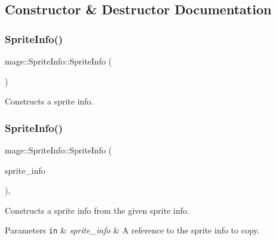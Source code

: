 \subsection{Constructor \& Destructor Documentation}
\hypertarget{structmage_1_1_sprite_info_ade666769e0e2137e68de6fd67502b234}{}\label{structmage_1_1_sprite_info_ade666769e0e2137e68de6fd67502b234} 
\subsubsection{\texorpdfstring{Sprite\+Info()}{SpriteInfo()}\hspace{0.1cm}{\footnotesize\ttfamily [1/3]}}
{\footnotesize\ttfamily mage\+::\+Sprite\+Info\+::\+Sprite\+Info (\begin{DoxyParamCaption}{ }\end{DoxyParamCaption})\hspace{0.3cm}{\ttfamily [noexcept]}}

Constructs a sprite info. \hypertarget{structmage_1_1_sprite_info_a982583a2e82d55a817d9f05f423ff4cf}{}\label{structmage_1_1_sprite_info_a982583a2e82d55a817d9f05f423ff4cf} 
\subsubsection{\texorpdfstring{Sprite\+Info()}{SpriteInfo()}\hspace{0.1cm}{\footnotesize\ttfamily [2/3]}}
{\footnotesize\ttfamily mage\+::\+Sprite\+Info\+::\+Sprite\+Info (\begin{DoxyParamCaption}\item[{const \hyperlink{structmage_1_1_sprite_info}{Sprite\+Info} \&}]{sprite\+\_\+info }\end{DoxyParamCaption})\hspace{0.3cm}{\ttfamily [default]}, {\ttfamily [noexcept]}}

Constructs a sprite info from the given sprite info.


\begin{DoxyParams}[1]{Parameters}
\mbox{\tt in}  & {\em sprite\+\_\+info} & A reference to the sprite info to copy. \\
\hline
\end{DoxyParams}
\hypertarget{structmage_1_1_sprite_info_a8d492a5c11814926d9352ef5b682fef1}{}\label{structmage_1_1_sprite_info_a8d492a5c11814926d9352ef5b682fef1} 

